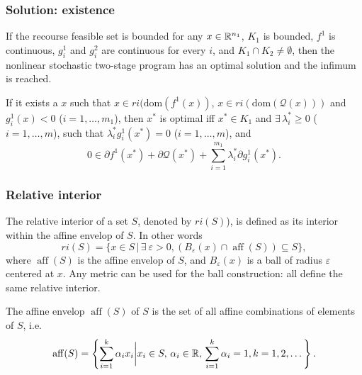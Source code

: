 \documentclass[french]{beamer}
\def\aff{\operatorname{aff}}
\begin{document}
\begin{frame}
\frametitle{Solution: existence}

\begin{theorem}
If the recourse feasible set is bounded for any $x \in \mathbb{R}^{n_1}$, $K_1$ is bounded, $f^1$ is continuous, $g_i^1$ and $g_i^2$ are continuous for every $i$, and $K_1 \cap K_2 \ne \emptyset$,
then the nonlinear stochastic two-stage program has an optimal solution and the infimum is reached.
\end{theorem}

\begin{theorem}
If it exists a $x$ such that $x \in ri(\mbox{dom}(f^1(x))$, $x \in ri(\mbox{dom}(\mathcal{Q}(x)))$ and $g_i^1(x) < 0$ ($i = 1,\ldots,m_1$), then $x^*$ is optimal iff $x^* \in K_1$ and $\exists\, \lambda_i^* \geq 0$ ($i = 1,\ldots,m$), such that $\lambda_i^*g_i^1(x^*)
= 0$ ($i = 1,\ldots,m$), and
\[
0 \in \partial f^1(x^*) + \partial \mathcal{Q}(x^*) +
\sum_{i=1}^{m_1}\lambda_i^* \partial g_i^1(x^*).
\]
\end{theorem}

\end{frame}

\begin{frame}
\frametitle{Relative interior}

The {\red relative interior} of a set $S$, denoted by $ri(S)$), is defined as its interior within the affine envelop of $S$.
In other words
\[
ri(S) = \lbrace x \in S \,|\, \exists\ \varepsilon > 0, (B_{\varepsilon}(x)
\cap \aff(S)) \subseteq S \rbrace,
\]
where $\aff(S)$ is the {\red affine envelop} of $S$, and $B_{\varepsilon}(x)$
is a ball of radius ${\varepsilon}$ centered at $x$.
Any metric can be used for the ball construction: all define the same relative interior.

\mbox{}

The {\red affine envelop} $\aff(S)$ of $S$ is the set of all affine combinations of elements of $S$, i.e.
\[
    \operatorname{aff} (S)=\left\lbrace \sum_{i=1}^k \alpha_i x_i \bigg|
      x_i\in S, \, \alpha_i\in \mathbb{R}, \, \sum_{i=1}^k \alpha_i=1,
      k=1, 2, \dots\right\rbrace. 
\]
\end{frame}
\end{document}
